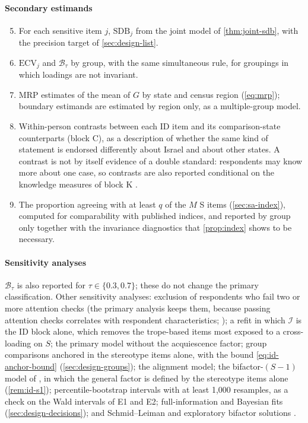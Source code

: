 \paragraph{Secondary estimands}
\begin{enumerate}[(E1)]\setcounter{enumi}{4}
  \item For each sensitive item $j$, $\mathrm{SDB}_j$ from the joint model of \cref{thm:joint-sdb}, with the precision target of \cref{sec:design-list}.
  \item $\mathrm{ECV}_j$ and $\mathcal{B}_\tau$ by group, with the same simultaneous rule, for groupings in which loadings are not invariant.
  \item MRP estimates of the mean of $G$ by state and census region (\cref{eq:mrp}); boundary estimands are estimated by region only, as a multiple-group model.
  \item Within-person contrasts between each ID item and its comparison-state counterparts (block C), as a description of whether the same kind of statement is endorsed differently about Israel and about other states. A contrast is not by itself evidence of a double standard: respondents may know more about one case, so contrasts are also reported conditional on the knowledge measures of block K \citep{beattie2017}.
  \item The proportion agreeing with at least $q$ of the $M$ S items (\cref{sec:sa-index}), computed for comparability with published indices, and reported by group only together with the invariance diagnostics that \cref{prop:index} shows to be necessary.
\end{enumerate}
\paragraph{Sensitivity analyses}
$\mathcal{B}_\tau$ is also reported for $\tau\in\{0.3,0.7\}$; these do not change the primary classification. Other sensitivity analyses: exclusion of respondents who fail two or more attention checks (the primary analysis keeps them, because passing attention checks correlates with respondent characteristics; \citealp{berinsky2014}); a refit in which $\mathcal I$ is the ID block alone, which removes the trope-based items most exposed to a cross-loading on $S$; the primary model without the acquiescence factor; group comparisons anchored in the stereotype items alone, with the bound \eqref{eq:id-anchor-bound} (\cref{sec:design-groups}); the alignment model; the bifactor-$(S-1)$ model of \citet{eid2017}, in which the general factor is defined by the stereotype items alone (\cref{rem:id-s1}); percentile-bootstrap intervals with at least 1{,}000 resamples, as a check on the Wald intervals of E1 and E2; full-information and Bayesian fits (\cref{sec:design-decisions}); and Schmid--Leiman and exploratory bifactor solutions \citep{schmid1957,reise2012}.

